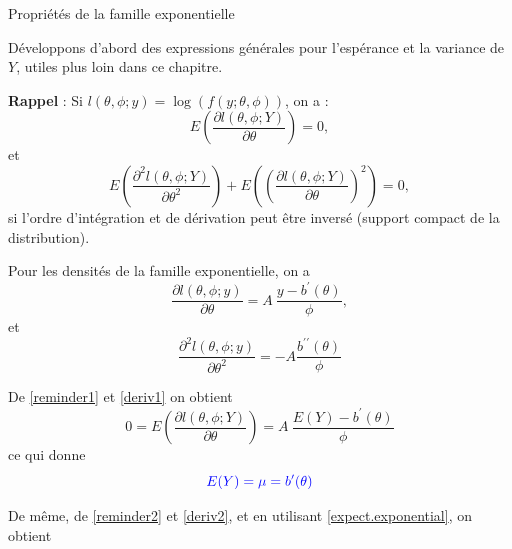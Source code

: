 \documentclass{BeamerTemplate}
\begin{document}
\begin{refsection}
\begin{frame}{Propriétés de la famille exponentielle}

Développons d'abord des expressions générales pour l'espérance et la variance
de $Y$, utiles plus loin dans ce chapitre.

\bigskip

\textbf{Rappel} : Si $l(\theta, \phi;y) = \log(f(y; \theta,\phi))$, on a :
\begin{equation}
\label{reminder1}
E\left(\frac{\partial l(\theta, \phi;Y)}{\partial \theta}\right)=0,
\end{equation}
et
\begin{equation}
\label{reminder2}
E\left(\frac{\partial^2 l(\theta, \phi;Y)}{\partial \theta^ 2}\right) +
E\left(\left(\frac{\partial l(\theta, \phi;Y)}{\partial \theta}\right)^2\right)=0,
\end{equation}
si l'ordre d'intégration et de dérivation peut être inversé (support compact
de la distribution).
\end{frame}


\begin{frame}{}


Pour les densités de la famille exponentielle, on a
\begin{equation}
\label{deriv1}
\frac{\partial l(\theta, \phi;y)}{\partial \theta} = A \  \frac{y -
b^{\prime}(\theta)}{\phi},  
\end{equation}
et
\begin{equation}
\label{deriv2}
\frac{\partial^2 l(\theta, \phi;y)}{\partial \theta^2} = - A \frac{b^{\prime \prime}(\theta)}{\phi}
\end{equation}

\bigskip
De \eqref{reminder1} et \eqref{deriv1} on obtient
$$0=E\left(\frac{\partial l(\theta, \phi;Y)}{\partial \theta}\right)=A \
\frac{E(Y) - b^{\prime}(\theta)}{\phi}$$
ce qui donne
\bigskip
\begin{equation}
\label{expect.exponential}
{\color{blue}E(Y) = \mu = b^{\prime}(\theta)}
\end{equation}
\end{frame}


\begin{frame}{}

De même, de \eqref{reminder2} et \eqref{deriv2}, et en utilisant
\eqref{expect.exponential}, on obtient


\end{frame}
\end{refsection}
\end{document}
